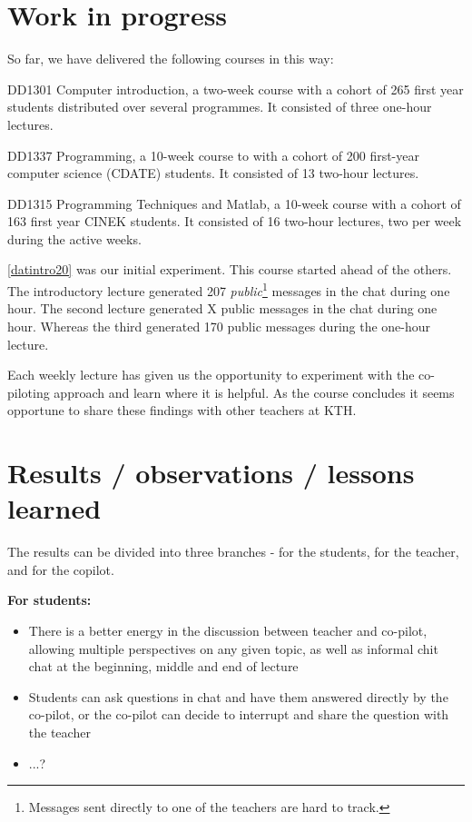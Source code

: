 \documentclass{article}
\begin{document}
\section*{Work in progress}

So far, we have delivered the following courses in this way:
\begin{courses}
  \item\label{datintro20} DD1301 Computer introduction, a two-week course with 
    a cohort of 265 first year students distributed over several programmes.
    It consisted of three one-hour lectures.

  \item\label{inda20} DD1337 Programming, a 10-week course to with a cohort of 
    200 first-year computer science (CDATE) students.
    It consisted of 13 two-hour lectures.

  \item\label{prgi20} DD1315 Programming Techniques and Matlab, a 10-week 
    course with a cohort of 163 first year CINEK students.
    It consisted of 16 two-hour lectures, two per week during the active weeks.
\end{courses}

\ref{datintro20} was our initial experiment.
This course started ahead of the others.
The introductory lecture generated
207
\emph{public}\footnote{%
  Messages sent directly to one of the teachers are hard to track.
} messages in the chat during one hour.
The second lecture generated
X%
public messages in the chat during one hour.
Whereas the third generated
170
public messages during the one-hour lecture.

Each weekly lecture has given us the opportunity to experiment with the 
co-piloting approach and learn where it is helpful.
As the course concludes it seems opportune to share these findings with other 
teachers at KTH.

\section*{Results / observations / lessons learned}
The results can be divided into three branches - for the students, for the teacher, and for the copilot.

\textbf{For students:}
\begin{itemize}
  \item There is a better energy in the discussion between teacher and co-pilot, allowing multiple perspectives on any given topic, as well as informal chit chat at the beginning, middle and end of lecture
  \item Students can ask questions in chat and have them answered directly by the co-pilot, or the co-pilot can decide to interrupt and share the question with the teacher
  \item ...?
\end{itemize}
\end{document}
